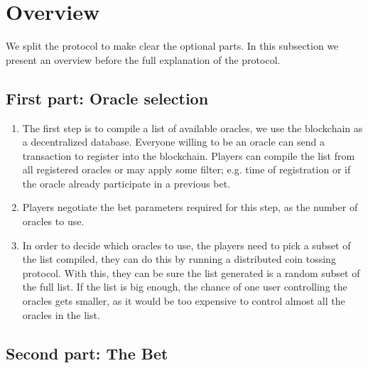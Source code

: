\section{Overview}

We split the protocol to make clear the optional parts.
In this subsection we present an overview before the full explanation of the
  protocol.

\subsection{First part: Oracle selection}

\begin{enumerate}
  \item The first step is to compile a list of available oracles, we use the
      blockchain as a decentralized database.
      Everyone willing to be an oracle can send a transaction to register into
      the blockchain.
      Players can compile the list from all registered oracles or may apply
      some filter; e.g. time of registration or if the oracle already participate
      in a previous bet.
  \item Players negotiate the bet parameters required for this step, as the
      number of oracles to use.
  \item In order to decide which oracles to use, the players need to pick a
      subset of the list compiled, they can do this by running a distributed
      coin tossing protocol.
    With this, they can be sure the list generated is a random subset of the
      full list. If the list is big enough, the chance of one user controlling
      the oracles gets smaller, as it would be too expensive to control almost
      all the oracles in the list.
\end{enumerate}

\subsection{Second part: The Bet}

